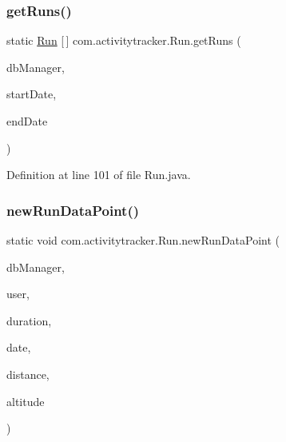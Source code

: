 \subsubsection{\texorpdfstring{get\+Runs()}{getRuns()}}
{\footnotesize\ttfamily static \mbox{\hyperlink{classcom_1_1activitytracker_1_1_run}{Run}} \mbox{[}$\,$\mbox{]} com.\+activitytracker.\+Run.\+get\+Runs (\begin{DoxyParamCaption}\item[{final \mbox{\hyperlink{classcom_1_1activitytracker_1_1_d_b_manager}{D\+B\+Manager}}}]{db\+Manager,  }\item[{final Date}]{start\+Date,  }\item[{final Date}]{end\+Date }\end{DoxyParamCaption})\hspace{0.3cm}{\ttfamily [static]}}



Definition at line 101 of file Run.\+java.

\mbox{\label{classcom_1_1activitytracker_1_1_run_a5dea6f1860431103d553ce770382afe0}} 
\subsubsection{\texorpdfstring{new\+Run\+Data\+Point()}{newRunDataPoint()}}
{\footnotesize\ttfamily static void com.\+activitytracker.\+Run.\+new\+Run\+Data\+Point (\begin{DoxyParamCaption}\item[{final \mbox{\hyperlink{classcom_1_1activitytracker_1_1_d_b_manager}{D\+B\+Manager}}}]{db\+Manager,  }\item[{final \mbox{\hyperlink{classcom_1_1activitytracker_1_1_user}{User}}}]{user,  }\item[{final float}]{duration,  }\item[{final Date}]{date,  }\item[{final float}]{distance,  }\item[{final float}]{altitude }\end{DoxyParamCaption})\hspace{0.3cm}{\ttfamily [static]}}



